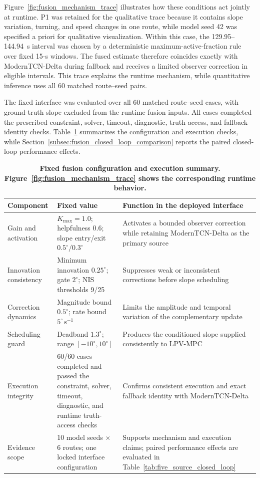 \documentclass{ieeeaccess}
\begin{document}
Figure~\ref{fig:fusion_mechanism_trace} illustrates how these conditions act
jointly at runtime. P1 was retained for the qualitative trace because it
contains slope variation, turning, and speed changes in one route, while model
seed 42 was specified a priori for qualitative visualization. Within this
case, the 129.95--144.94~s interval was chosen by a deterministic
maximum-active-fraction rule over fixed 15-s windows. The fused estimate
therefore coincides exactly with ModernTCN-Delta during fallback and receives a
limited observer correction in eligible intervals. This trace explains the
runtime mechanism, while quantitative inference uses all 60 matched
route--seed pairs.

The fixed interface was evaluated over all 60 matched route--seed cases, with
ground-truth slope excluded from the runtime fusion inputs. All cases completed
the prescribed constraint, solver, timeout, diagnostic, truth-access, and
fallback-identity checks. Table~\ref{tab:observer_fusion_evidence} summarizes
the configuration and execution checks, while Section~\ref{subsec:fusion_closed_loop_comparison} reports the paired
closed-loop performance effects.

\begin{table}[!tbp]
\centering
\caption{\textbf{Fixed fusion configuration and execution summary. Figure~\ref{fig:fusion_mechanism_trace} shows the corresponding runtime behavior.}}
\label{tab:observer_fusion_evidence}
\scriptsize
\setlength{\tabcolsep}{3.2pt}
\begin{tabular}{|p{}|p{}|p{}|}
\hline
Component & Fixed value & Function in the deployed interface \\
\hline
Gain and activation
& $K_{\max}=1.0$; helpfulness 0.6; slope entry/exit $0.5^{\circ}/0.3^{\circ}$
& Activates a bounded observer correction while retaining ModernTCN-Delta as the primary source \\
Innovation consistency
& Minimum innovation $0.25^{\circ}$; gate $2^{\circ}$; NIS thresholds 9/25
& Suppresses weak or inconsistent corrections before slope scheduling \\
Correction dynamics
& Magnitude bound $0.5^{\circ}$; rate bound $5^{\circ}\,\mathrm{s}^{-1}$
& Limits the amplitude and temporal variation of the complementary update \\
Scheduling guard
& Deadband $1.3^{\circ}$; range $[-10^{\circ},10^{\circ}]$
& Produces the conditioned slope supplied consistently to LPV-MPC \\
Execution integrity
& 60/60 cases completed and passed the constraint, solver, timeout, diagnostic, and runtime truth-access checks
& Confirms consistent execution and exact fallback identity with ModernTCN-Delta \\
Evidence scope
& 10 model seeds $\times$ 6 routes; one locked interface configuration
& Supports mechanism and execution claims; paired performance effects are evaluated in Table~\ref{tab:five_source_closed_loop} \\
\hline
\end{tabular}
\end{table}
\end{document}
